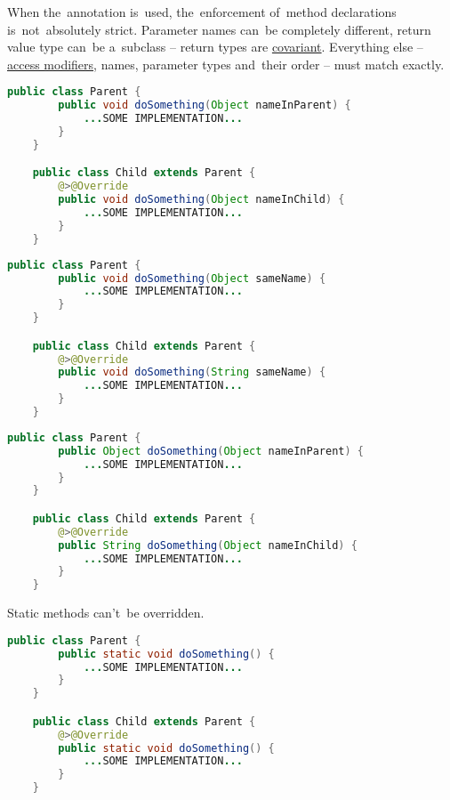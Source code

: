 \noindent When the~annotation is~used, the~enforcement of~method declarations is~not~absolutely strict.
Parameter names can~be completely different, return value type can~be a~subclass -- return types are \hyperref[covariance]{covariant}.
Everything else -- \hyperref[javaaccessmodifiers]{access modifiers}, names, parameter types and~their order -- must match exactly.

\begin{lstlisting}[language=Java]
    public class Parent {
        public void doSomething(Object nameInParent) {
            ...SOME IMPLEMENTATION...
        }
    }

    public class Child extends Parent {
        @>@Override
        public void doSomething(Object nameInChild) {
            ...SOME IMPLEMENTATION...
        }
    }
\end{lstlisting}

\begin{lstlisting}[language=Java]
    public class Parent {
        public void doSomething(Object sameName) {
            ...SOME IMPLEMENTATION...
        }
    }

    public class Child extends Parent {
        @>@Override
        public void doSomething(String sameName) {
            ...SOME IMPLEMENTATION...
        }
    }
\end{lstlisting}

\begin{lstlisting}[language=Java]
    public class Parent {
        public Object doSomething(Object nameInParent) {
            ...SOME IMPLEMENTATION...
        }
    }

    public class Child extends Parent {
        @>@Override
        public String doSomething(Object nameInChild) {
            ...SOME IMPLEMENTATION...
        }
    }
\end{lstlisting}

\warning Static methods can't~be overridden.

\begin{lstlisting}[language=Java]
    public class Parent {
        public static void doSomething() {
            ...SOME IMPLEMENTATION...
        }
    }

    public class Child extends Parent {
        @>@Override
        public static void doSomething() {
            ...SOME IMPLEMENTATION...
        }
    }
\end{lstlisting}

